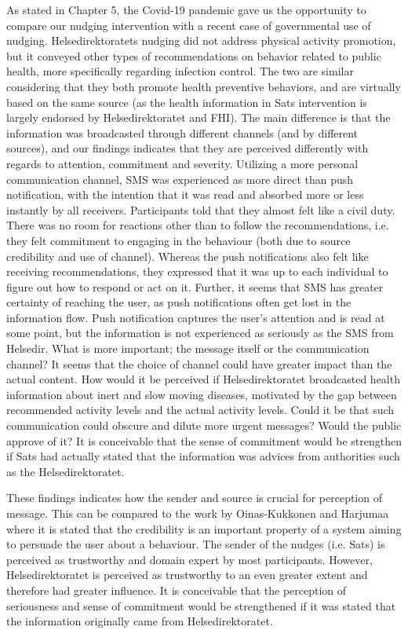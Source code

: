 As stated in Chapter 5, the Covid-19 pandemic gave us the opportunity to compare our nudging intervention with a recent case of governmental use of nudging. Helsedirektoratets nudging did not address physical activity promotion, but it conveyed other types of recommendations on behavior related to public health, more specifically regarding infection control. The two are similar considering that they both promote health preventive behaviors, and are virtually based on the same source (as the health information in Sats intervention is largely endorsed by Helsedirektoratet and FHI). The main difference is that the information was broadcasted through different channels (and by different sources), and our findings indicates that they are perceived differently with regards to attention, commitment and severity. Utilizing a more personal communication channel, SMS was experienced as more direct than push notification, with the intention that it was read and absorbed more or less instantly by all receivers. Participants told that they almost felt like a civil duty. There was no room for reactions other than to follow the recommendations, i.e. they felt commitment to engaging in the behaviour (both due to source credibility and use of channel). Whereas the push notifications also felt like receiving recommendations, they expressed that it was up to each individual to figure out how to respond or act on it. Further, it seems that SMS has greater certainty of reaching the user, as push notifications often get lost in the information flow. Push notification captures the user's attention and is read at some point, but the information is not experienced as seriously as the SMS from Helsedir. What is more important; the message itself or the communication channel? It seems that the choice of channel could have greater impact than the actual content. How would it be perceived if Helsedirektoratet broadcasted health information about inert and slow moving diseases, motivated by the gap between recommended activity levels and the actual activity levels. Could it be that such communication could obscure and dilute more urgent messages? Would the public approve of it? It is conceivable that the sense of commitment would be strengthen if Sats had actually stated that the information was advices from authorities such as the Helsedirektoratet. 

These findings indicates how the sender and source is crucial for perception of message. This can be compared to the work by Oinas-Kukkonen and Harjumaa\cite{oinas-kukkonen_persuasive_2009}
where it is stated that the credibility is an important property of a system aiming to persuade the user about a behaviour. The sender of the nudges (i.e. Sats) is perceived as trustworthy and domain expert by most participants. However, Helsedirektoratet is perceived as trustworthy to an even greater extent and therefore had greater influence. It is conceivable that the perception of seriousness and sense of commitment would be strengthened if it was stated that the information originally came from Helsedirektoratet. 

